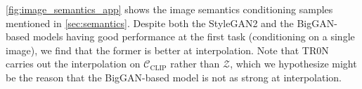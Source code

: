 \documentclass[nohyperref]{article}
\theoremstyle{plain}
\theoremstyle{definition}
\theoremstyle{remark}
\begin{document}
\autoref{fig:image_semantics_app} shows the image semantics conditioning samples mentioned in \autoref{sec:semantics}. Despite both the StyleGAN2 and the BigGAN-based models having good performance at the first task (conditioning on a single image), we find that the former is better at interpolation. Note that TR0N carries out the interpolation on $\mathcal{C}_{\text{CLIP}}$ rather than $\mathcal{Z}$, which we hypothesize might be the reason that the BigGAN-based model is not as strong at interpolation. 
\end{document}
